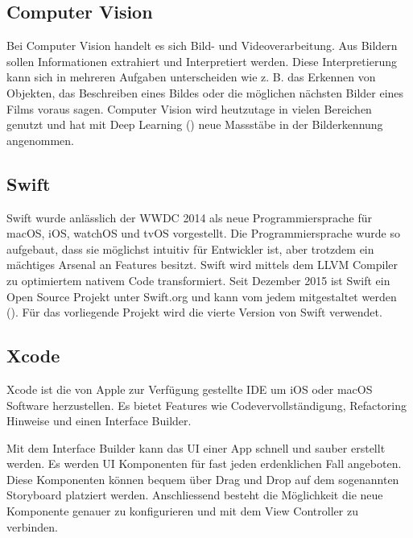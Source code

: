 \subsection{Computer Vision} \label{sub:computer-vision}
Bei Computer Vision handelt es sich Bild- und Videoverarbeitung. Aus Bildern sollen Informationen extrahiert und Interpretiert werden. Diese Interpretierung kann sich in mehreren Aufgaben unterscheiden wie z. B. das Erkennen von Objekten, das Beschreiben eines Bildes oder die möglichen nächsten Bilder eines Films voraus sagen. Computer Vision wird heutzutage in vielen Bereichen genutzt und hat mit Deep Learning (\cite{DBLP:journals/corr/SzegedyVISW15}) neue Massstäbe in der Bilderkennung angenommen.

\subsection{Swift} \label{sub:swift}
Swift wurde anlässlich der WWDC 2014 als neue Programmiersprache für macOS, iOS, watchOS und tvOS vorgestellt. Die Programmiersprache wurde so aufgebaut, dass sie möglichst intuitiv für Entwickler ist, aber trotzdem ein mächtiges Arsenal an Features besitzt. Swift wird mittels dem LLVM Compiler zu optimiertem nativem Code transformiert. Seit Dezember 2015 ist Swift ein Open Source Projekt unter Swift.org und kann vom jedem mitgestaltet werden (\cite{swift-org}). Für das vorliegende Projekt wird die vierte Version von Swift verwendet.


\subsection{Xcode} \label{sub:xcode}
Xcode ist die von Apple zur Verfügung gestellte IDE um iOS oder macOS Software herzustellen. Es bietet Features wie Codevervollständigung, Refactoring Hinweise und einen Interface Builder.

Mit dem Interface Builder kann das UI einer App schnell und sauber erstellt werden. Es werden UI Komponenten für fast jeden erdenklichen Fall angeboten. Diese Komponenten können bequem über Drag und Drop auf dem sogenannten Storyboard platziert werden. Anschliessend besteht die Möglichkeit die neue Komponente genauer zu konfigurieren und mit dem View Controller zu verbinden.
